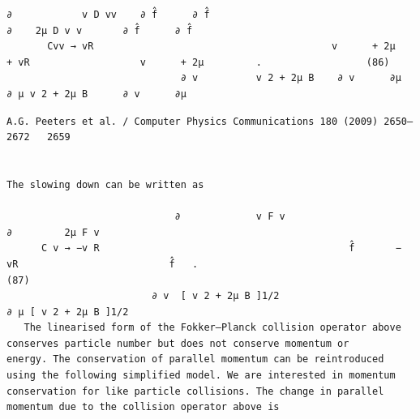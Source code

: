 \documentclass[a4paper]{article}
\newcommand{\gkwpagefont}{\fontsize{6.0pt}{7.55pt}\selectfont}
\begin{document}
\begin{Verbatim}[fontsize=\gkwpagefont]
                                   ∂            v D vv    ∂ f̂      ∂ f̂                                     ∂    2μ D v v       ∂ f̂      ∂ f̂
       Cvv → vR                                         v      + 2μ                                    + vR                   v      + 2μ         .                  (86)
                              ∂ v          v 2 + 2μ B    ∂ v      ∂μ                                      ∂ μ v 2 + 2μ B      ∂ v      ∂μ
\end{Verbatim}
\newpage
\begin{Verbatim}[fontsize=\gkwpagefont]
                                                                A.G. Peeters et al. / Computer Physics Communications 180 (2009) 2650–2672   2659


The slowing down can be written as
                                                                                                  
                             ∂             v F v                           ∂         2μ F v
      C v → −v R                                           f̂       − vR                          f̂   .                                     (87)
                         ∂ v  [ v 2 + 2μ B ]1/2                          ∂ μ [ v 2 + 2μ B ]1/2
   The linearised form of the Fokker–Planck collision operator above conserves particle number but does not conserve momentum or
energy. The conservation of parallel momentum can be reintroduced using the following simplified model. We are interested in momentum
conservation for like particle collisions. The change in parallel momentum due to the collision operator above is
                                                                                                                         

\end{Verbatim}
\end{document}
